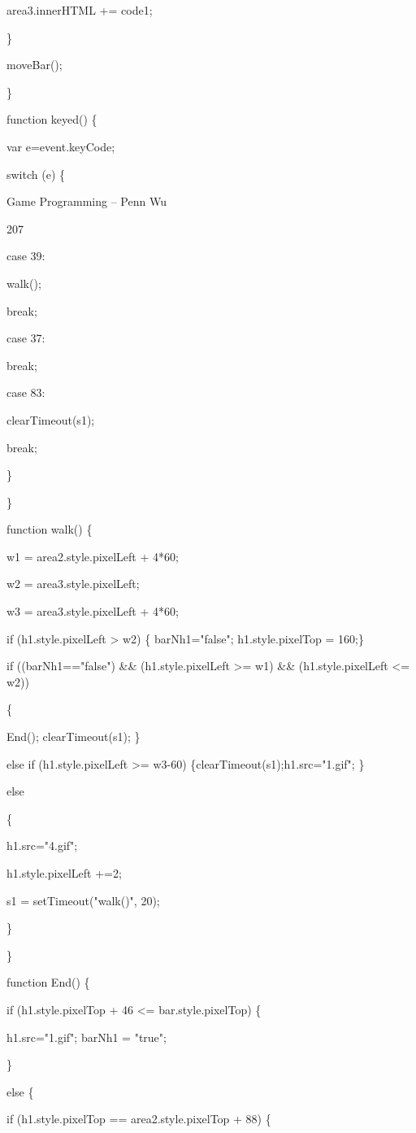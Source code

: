 \documentclass[
]{article}
\begin{document}
area3.innerHTML += code1;

\}

moveBar();

\}

function keyed() \{

var e=event.keyCode;

switch (e) \{

Game Programming -- Penn Wu

207

\protect\hypertarget{index_split_011.htmlux5cux23p208}{}{} case 39:

walk();

break;

case 37:

break;

case 83:

clearTimeout(s1);

break;

\}

\}

function walk() \{

w1 = area2.style.pixelLeft + 4*60;

w2 = area3.style.pixelLeft;

w3 = area3.style.pixelLeft + 4*60;

if (h1.style.pixelLeft \textgreater{} w2) \{ barNh1="false";
h1.style.pixelTop = 160;\}

if ((barNh1=="false") \&\& (h1.style.pixelLeft \textgreater= w1) \&\&
(h1.style.pixelLeft \textless= w2))

\{

End(); clearTimeout(s1); \}

else if (h1.style.pixelLeft \textgreater= w3-60)
\{clearTimeout(s1);h1.src="1.gif"; \}

else

\{

h1.src="4.gif";

h1.style.pixelLeft +=2;

s1 = setTimeout("walk()", 20);

\}

\}

function End() \{

if (h1.style.pixelTop + 46 \textless= bar.style.pixelTop) \{

h1.src="1.gif"; barNh1 = "true";

\}

else \{

if (h1.style.pixelTop == area2.style.pixelTop + 88) \{
\end{document}
